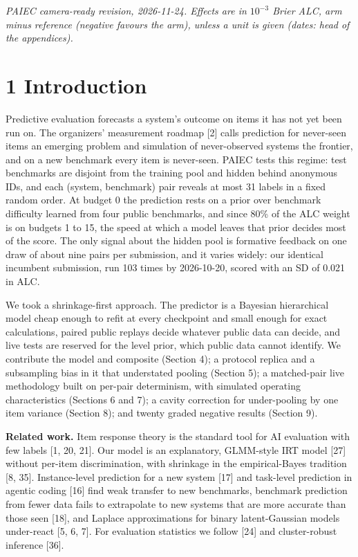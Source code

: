 \documentclass[
]{article}
\begin{document}
\emph{PAIEC camera-ready revision, 2026-11-24. Effects are in
\(10^{-3}\) Brier ALC, arm minus reference (negative favours the arm),
unless a unit is given (dates: head of the appendices).}

\section{1 Introduction}\label{introduction}

Predictive evaluation forecasts a system's outcome on items it has not
yet been run on. The organizers' measurement roadmap {[}2{]} calls
prediction for never-seen items an emerging problem and simulation of
never-observed systems the frontier, and on a new benchmark every item
is never-seen. PAIEC tests this regime: test benchmarks are disjoint
from the training pool and hidden behind anonymous IDs, and each
(system, benchmark) pair reveals at most 31 labels in a fixed random
order. At budget 0 the prediction rests on a prior over benchmark
difficulty learned from four public benchmarks, and since 80\% of the
ALC weight is on budgets 1 to 15, the speed at which a model leaves that
prior decides most of the score. The only signal about the hidden pool
is formative feedback on one draw of about nine pairs per submission,
and it varies widely: our identical incumbent submission, run 103 times
by 2026-10-20, scored with an SD of 0.021 in ALC.

We took a shrinkage-first approach. The predictor is a Bayesian
hierarchical model cheap enough to refit at every checkpoint and small
enough for exact calculations, paired public replays decide whatever
public data can decide, and live tests are reserved for the level prior,
which public data cannot identify. We contribute the model and composite
(Section 4); a protocol replica and a subsampling bias in it that
understated pooling (Section 5); a matched-pair live methodology built
on per-pair determinism, with simulated operating characteristics
(Sections 6 and 7); a cavity correction for under-pooling by one item
variance (Section 8); and twenty graded negative results (Section 9).

\textbf{Related work.} Item response theory is the standard tool for AI
evaluation with few labels {[}1, 20, 21{]}. Our model is an explanatory,
GLMM-style IRT model {[}27{]} without per-item discrimination, with
shrinkage in the empirical-Bayes tradition {[}8, 35{]}. Instance-level
prediction for a new system {[}17{]} and task-level prediction in
agentic coding {[}16{]} find weak transfer to new benchmarks, benchmark
prediction from fewer data fails to extrapolate to new systems that are
more accurate than those seen {[}18{]}, and Laplace approximations for
binary latent-Gaussian models under-react {[}5, 6, 7{]}. For evaluation
statistics we follow {[}24{]} and cluster-robust inference {[}36{]}.
\end{document}
